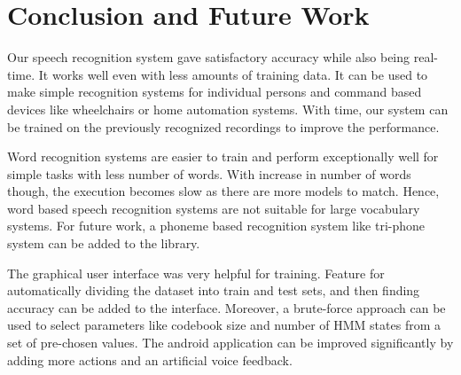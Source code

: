 \chapter{Conclusion and Future Work} \label{ch:conclusion}

Our speech recognition system gave satisfactory accuracy while also being real-time. It works well even with less amounts of training data. It can be used to make simple recognition systems for individual persons and command based devices like wheelchairs or home automation systems. With time, our system can be trained on the previously recognized recordings to improve the performance.

Word recognition systems are easier to train and perform exceptionally well for simple tasks with less number of words.
With increase in number of words though, the execution becomes slow as there are more models to match. Hence, word based speech recognition systems are not suitable for large vocabulary systems. For future work, a phoneme based recognition system like tri-phone system can be added to the library.

The graphical user interface was very helpful for training. Feature for automatically dividing the dataset into train and test sets, and then finding accuracy can be added to the interface. Moreover, a brute-force approach can be used to select parameters like codebook size and number of HMM states from a set of pre-chosen values. The android application can be improved significantly by adding more actions and an artificial voice feedback.